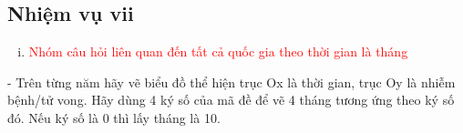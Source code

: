 \documentclass[a4paper]{article}
\theoremstyle{definition}
\begin{document}
	










\subsection{Nhiệm vụ vii}
\begin{enumerate}[vii)]
\item \textcolor{red}{Nhóm câu hỏi liên quan đến tất cả quốc gia theo thời gian là tháng}
\end{enumerate}

- Trên từng năm hãy vẽ biểu đồ thể hiện trục Ox là thời gian, trục Oy là nhiễm bệnh/tử vong. Hãy dùng 4 ký số của mã đề để vẽ 4 tháng tương ứng theo ký số đó. Nếu ký số là 0 thì lấy tháng là 10. 
\end{document}
